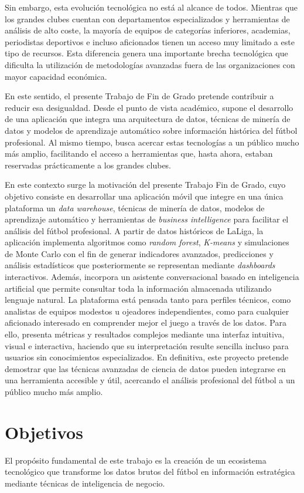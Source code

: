 Sin embargo, esta evolución tecnológica no está al alcance de todos. Mientras que los grandes clubes cuentan con departamentos especializados y herramientas de análisis de alto coste, la mayoría de equipos de categorías inferiores, academias, periodistas deportivos e incluso aficionados tienen un acceso muy limitado a este tipo de recursos. Esta diferencia genera una importante brecha tecnológica que dificulta la utilización de metodologías avanzadas fuera de las organizaciones con mayor capacidad económica.

En este sentido, el presente Trabajo de Fin de Grado pretende contribuir a reducir esa desigualdad. Desde el punto de vista académico, supone el desarrollo de una aplicación que integra una arquitectura de datos, técnicas de minería de datos y modelos de aprendizaje automático sobre información histórica del fútbol profesional. Al mismo tiempo, busca acercar estas tecnologías a un público mucho más amplio, facilitando el acceso a herramientas que, hasta ahora, estaban reservadas prácticamente a los grandes clubes.

En este contexto surge la motivación del presente Trabajo Fin de Grado, cuyo objetivo consiste en desarrollar una aplicación móvil que integre en una única plataforma un \textit{data warehouse}, técnicas de minería de datos, modelos de aprendizaje automático y herramientas de \textit{business intelligence} para facilitar el análisis del fútbol profesional. A partir de datos históricos de LaLiga, la aplicación implementa algoritmos como \textit{random forest}, \textit{K-means} y simulaciones de Monte Carlo con el fin de generar indicadores avanzados, predicciones y análisis estadísticos que posteriormente se representan mediante \textit{dashboards} interactivos. Además, incorpora un asistente conversacional basado en inteligencia artificial que permite consultar toda la información almacenada utilizando lenguaje natural. La plataforma está pensada tanto para perfiles técnicos, como analistas de equipos modestos u ojeadores independientes, como para cualquier aficionado interesado en comprender mejor el juego a través de los datos. Para ello, presenta métricas y resultados complejos mediante una interfaz intuitiva, visual e interactiva, haciendo que su interpretación resulte sencilla incluso para usuarios sin conocimientos especializados. En definitiva, este proyecto pretende demostrar que las técnicas avanzadas de ciencia de datos pueden integrarse en una herramienta accesible y útil, acercando el análisis profesional del fútbol a un público mucho más amplio.
\section{Objetivos} 
El propósito fundamental de este trabajo es la creación de un ecosistema tecnológico que transforme los datos brutos del fútbol en información estratégica mediante técnicas de inteligencia de negocio.

